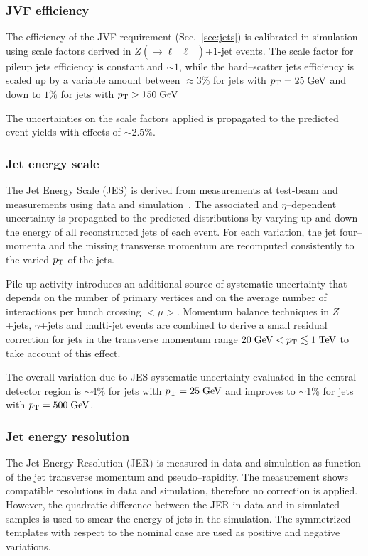 \subsubsection{JVF efficiency}
\label{sec:syst_jvf}

The efficiency of the JVF requirement (Sec.~\ref{sec:jets}) is
calibrated in simulation using scale factors derived in $Z(\to
\ell^+\ell^-)$+1-jet events. The scale factor for pileup jets efficiency is
constant and $\sim1$, while the hard--scatter jets efficiency is
scaled up by a variable amount between $\approx3\%$ for jets with
$p_{\mathrm{T}}{}=25\; \mathrm{GeV}{}$ and down to $1\%$ for jets with $p_{\mathrm{T}}{}>150\; \mathrm{GeV}{}$

The uncertainties on the scale factors applied is propagated to the
predicted event yields with effects of $\sim2.5\%$.

\subsubsection{Jet energy scale}
\label{sec:syst_jes}

The Jet Energy Scale (JES) is derived from measurements at test-beam 
and measurements using data and simulation~\cite{jes}. 
The associated \pt{} and $\eta$--dependent uncertainty is propagated
to the predicted distributions by varying up and down the energy of
all reconstructed jets of each event. For each variation, the jet
four--momenta and the missing transverse momentum
\met{} are recomputed consistently to the varied $p_{\mathrm{T}}$ of the jets.

Pile-up activity introduces an additional source of systematic 
uncertainty that depends on the number of primary vertices
and on the average number of interactions per bunch crossing $<\mu>$. 
Momentum balance techniques in $Z$+jets, $\gamma$+jets and 
multi-jet events are combined to derive a small residual correction
for jets in the transverse momentum range $20\; \mathrm{GeV}{}<p_{\mathrm{T}}{}\lesssim
1\; \mathrm{TeV}$ to take account of this effect.

The overall variation due to JES systematic uncertainty 
evaluated in the central detector region 
is $\sim$4\% for jets with $p_{\mathrm{T}}{}=25\; \mathrm{GeV}$ and improves to $\sim$1\% for  
jets with $p_{\mathrm{T}}=500\; \mathrm{GeV}$.

\subsubsection{Jet energy resolution}
\label{sec:syst_jer}

The Jet Energy Resolution (JER) is measured in data and simulation
as function of the jet transverse momentum and pseudo--rapidity.
The measurement shows compatible resolutions in data and simulation,
therefore no correction is applied. However, the quadratic difference
between the JER in data and in simulated samples is used to smear the
energy of jets in the simulation. The symmetrized templates with
respect to the nominal case are used as positive and negative
variations.

